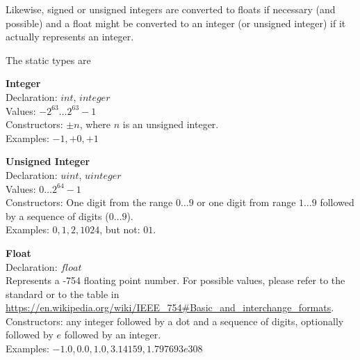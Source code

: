 Likewise, signed or unsigned integers are converted to floats
if necessary (and possible) and a float might be converted
to an integer (or unsigned integer) if it actually
represents an integer.

The static types are


\begin{minipage}{\textwidth}
\textbf{Integer}\\
Declaration: $int$, $integer$ \\
Values: $-2^{63} \dots 2^{63}-1$ \\
Constructors: $\pm n$, where $n$ is an unsigned integer.\\
Examples: $-1, +0, +1$
\end{minipage}

\begin{minipage}{\textwidth}
\textbf{Unsigned Integer} \\
Declaration: $uint$, $uinteger$ \\
Values: $0 \dots 2^{64}-1$  \\
Constructors: One digit from the range $0\dots 9$
or one digit from range $1\dots 9$ followed by
a sequence of digits ($0\dots9$). \\
Examples: $0, 1, 2, 1024$, but not: $01$.
\end{minipage}

\begin{minipage}{\textwidth}
\textbf{Float} \\
Declaration: $float$ \\
Represents a  -754 floating point number.
For possible values, please refer to the standard or to the table in
\url{https://en.wikipedia.org/wiki/IEEE\_754#Basic\_and\_interchange\_formats}.\\
Constructors: any integer followed by a dot and a sequence of digits,
              optionally followed by $e$ followed by an integer.
               \\
Examples: $-1.0, 0.0, 1.0, 3.14159, 1.797693e308$ 
\end{minipage}

